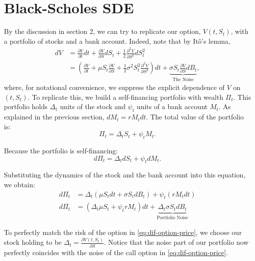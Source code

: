 \documentclass{article}
\theoremstyle{definition}
\theoremstyle{remark}
\begin{document}
\section{Black-Scholes SDE}
By the discussion in section 2, we can try to replicate our option, $V(t,S_t)$, with a portfolio of stocks and a bank account. Indeed, note that by Itô's lemma,\begin{equation}\label{eq:dif-option-price}\begin{split}
dV &= \frac{\partial V}{\partial t}dt + \frac{\partial V}{\partial S}dS_t + \frac{1}{2} \frac{\partial^2 V}{\partial S^2}dS_t^2 \\
&= \left( \frac{\partial V}{\partial t} + \mu S_t \frac{\partial V}{\partial S} + \frac{1}{2}\sigma^2 S_t^2 \frac{\partial^2 V}{\partial S^2} \right) dt + \underbrace{\sigma S_t \frac{\partial V}{\partial S} dB_t}_{\text{The Noise}},\end{split}
\end{equation}where, for notational convenience, we suppress the explicit dependence of $V$ on $(t, S_t)$. To replicate this, we build a self-financing portfolio with wealth $\Pi_t$. This portfolio holds $\Delta_t$ units of the stock and $\psi_t$ units of a bank account $M_t$. As explained in the previous section, $dM_t = r M_t dt$. The total value of the portfolio is:
\begin{equation}\label{eq:portfolio}
    \Pi_t = \Delta_t S_t + \psi_t M_t.
\end{equation}


Because the portfolio is self-financing:
\begin{equation}\label{eq:portfolio-diff-2}
    d\Pi_t = \Delta_t dS_t + \psi_t dM_t.
\end{equation}


Substituting the dynamics of the stock and the bank account into this equation, we obtain:
\begin{align*}
d\Pi_t &= \Delta_t (\mu S_tdt+\sigma S_td B_t) + \psi_t (r M_t dt) \\
d\Pi_t &= \left( \Delta_t \mu S_t + \psi_t r M_t \right) dt + \underbrace{\Delta_t \sigma S_t dB_t}_{\text{Portfolio Noise}}
\end{align*}

To perfectly match the risk of the option in \eqref{eq:dif-option-price}, we choose our stock holding to be $\Delta_t = \frac{\partial V(t,S_t)}{\partial S}$. Notice that the noise part of our portfolio now perfectly coincides with the noise of the call option in \eqref{eq:dif-option-price}.
\end{document}
